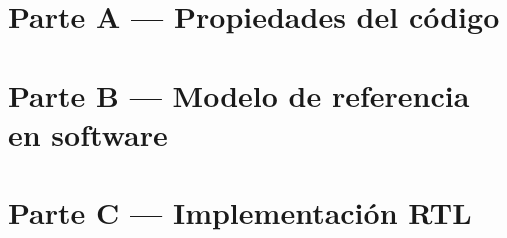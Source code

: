 \documentclass{article}
\begin{document}
\renewcommand{\figureautorefname}{Fig.}
\renewcommand{\tableautorefname}{Tab.}
\renewcommand{\equationautorefname}{Ec.}


\newpage

\tableofcontents
\newpage

\section{Parte A — Propiedades del código}



%
\newpage
\section{Parte B — Modelo de referencia en software}
%
%

\newpage
\section{Parte C — Implementación RTL}
%

\newpage

\end{document}
